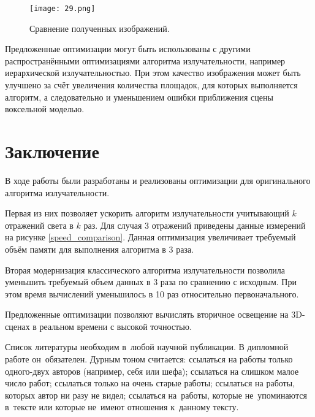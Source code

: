 \documentclass[12pt,fleqn]{article}
\begin{document}
\begin{figure}[htb]
    \centering
    \texttt{[image: 29.png]}
    \caption{Сравнение полученных изображений.}
    \label{image_comparison3}
\end{figure}

Предложенные оптимизации могут быть использованы с другими распространёнными оптимизациями алгоритма излучательности, например иерархической излучательностью. При этом качество изображения может быть улучшено за счёт увеличения количества площадок, для которых выполняется алгоритм, а следовательно и уменьшением ошибки приближения сцены воксельной моделью.

\pagebreak

\section{Заключение}

В ходе работы были разработаны и реализованы оптимизации для оригинального алгоритма излучательности. 

Первая из них позволяет ускорить алгоритм излучательности учитывающий $k$ отражений света в $k$ раз. Для случая 3 отражений приведены данные измерений на рисунке \ref{speed_comparison}. Данная оптимизация увеличивает требуемый объём памяти для выполнения алгоритма в 3 раза.

Вторая модернизация классического алгоритма излучательности позволила уменьшить требуемый объем данных в 3 раза по сравнению с исходным. При этом время вычислений уменьшилось в 10 раз относительно первоначального.

Предложенные оптимизации позволяют вычислять вторичное освещение на 3D-сценах в реальном времени с высокой точностью.

\newpage
Список литературы необходим в~любой научной публикации. 
В дипломной работе он~обязателен. 
Дурным тоном считается:
ссылаться на работы только одного-двух авторов (например, себя или шефа);
ссылаться на слишком малое число работ;
ссылаться только на очень старые работы;
ссылаться на работы, которых автор ни разу не видел;
ссылаться на~работы, которые не~упоминаются в~тексте
или которые не~имеют отношения к~данному тексту.

\renewcommand{\bibname}{Список литературы}
\addcontentsline{toc}{section}{\bibname}

\nocite{hastie09elements,bishop06pattern,zhuravlev06recognition,zhuravlev78prob33,shlezinger04ten,boucheron05theory}

\def\BibUrl#1.{}\def\BibAnnote#1.{}


\end{document}
